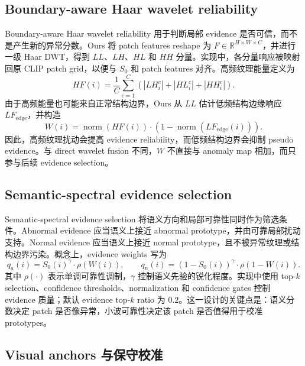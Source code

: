\documentclass[runningheads]{llncs}
\newcommand{\normop}{\operatorname{norm}}
\begin{document}
\subsection{Boundary-aware Haar wavelet reliability}

Boundary-aware Haar wavelet reliability 用于判断局部 evidence 是否可信，而不是产生新的异常分数。Ours 将 patch features reshape 为 $F\in\mathbb{R}^{H\times W\times C}$，并进行一级 Haar DWT，得到 $LL$、$LH$、$HL$ 和 $HH$ 分量。实现中，各分量响应被映射回原 CLIP patch grid，以便与 $S_0$ 和 patch features 对齐。高频纹理能量定义为
\begin{equation}
HF(i)=\frac{1}{C}\sum_{c=1}^{C}\left(|LH_i^c|+|HL_i^c|+|HH_i^c|\right).
\end{equation}
由于高频能量也可能来自正常结构边界，Ours 从 $LL$ 估计低频结构边缘响应 $LF_{\mathrm{edge}}$，并构造
\begin{equation}
W(i)=\normop(HF(i))\cdot\left(1-\normop(LF_{\mathrm{edge}}(i))\right).
\end{equation}
因此，高频纹理扰动会提高 evidence reliability，而低频结构边界会抑制 pseudo evidence。与 direct wavelet fusion 不同，$W$ 不直接与 anomaly map 相加，而只参与后续 evidence selection。

\subsection{Semantic-spectral evidence selection}

Semantic-spectral evidence selection 将语义方向和局部可靠性同时作为筛选条件。Abnormal evidence 应当语义上接近 abnormal prototype，并由可靠局部扰动支持。Normal evidence 应当语义上接近 normal prototype，且不被异常纹理或结构边界污染。概念上，evidence weights 写为
\begin{equation}
q_a(i)=S_0(i)^\gamma\cdot\rho(W(i)),\qquad
q_n(i)=(1-S_0(i))^\gamma\cdot\rho(1-W(i)).
\end{equation}
其中 $\rho(\cdot)$ 表示单调可靠性调制，$\gamma$ 控制语义先验的锐化程度。实现中使用 top-$k$ selection、confidence thresholds、normalization 和 confidence gates 控制 evidence 质量；默认 evidence top-$k$ ratio 为 $0.2$。这一设计的关键点是：语义分数决定 patch 是否像异常，小波可靠性决定该 patch 是否值得用于校准 prototypes。

\subsection{Visual anchors 与保守校准}
\end{document}
